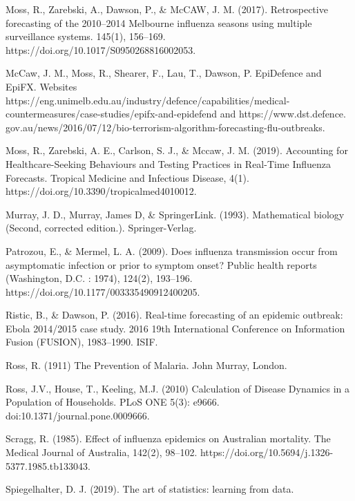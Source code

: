 \begin{thebibliography}{99}
	 Moss, R., Zarebski, A., Dawson, P., \& McCAW, J. M. (2017). Retrospective forecasting of the 2010–2014 Melbourne influenza seasons using multiple surveillance systems. 145(1), 156–169. https://doi.org/10.1017/S0950268816002053.
	
	 McCaw, J. M., Moss, R., Shearer, F., Lau, T., Dawson, P. EpiDefence and EpiFX. Websites https://eng.unimelb.edu.au/industry/defence/capabilities/medical-\\
	countermeasures/case-studies/epifx-and-epidefend and 
	https://www.dst.defence. gov.au/news/2016/07/12/bio-terrorism-algorithm-forecasting-flu-outbreaks.
	
	 Moss, R., Zarebski, A. E., Carlson, S. J., \& Mccaw, J. M. (2019). Accounting for Healthcare-Seeking Behaviours and Testing Practices in Real-Time Influenza Forecasts. Tropical Medicine and Infectious Disease, 4(1). https://doi.org/10.3390/tropicalmed4010012.
	
	 Murray, J. D., Murray, James D, \& SpringerLink. (1993). Mathematical biology (Second, corrected edition.). Springer-Verlag.
	
	 Patrozou, E., \& Mermel, L. A. (2009). Does influenza transmission occur from asymptomatic infection or prior to symptom onset? Public health reports (Washington, D.C. : 1974), 124(2), 193–196. https://doi.org/10.1177/003335490912400205.
	
	 Ristic, B., \& Dawson, P. (2016). Real-time forecasting of an epidemic outbreak: Ebola 2014/2015 case study. 2016 19th International Conference on Information Fusion (FUSION), 1983–1990. ISIF.
	
	 Ross, R. (1911) The Prevention of Malaria. John Murray, London.
	
	 Ross, J.V., House, T., Keeling, M.J. (2010) Calculation of Disease Dynamics in a Population of Households. PLoS ONE 5(3): e9666. doi:10.1371/journal.pone.0009666.
	
	 Scragg, R. (1985). Effect of influenza epidemics on Australian mortality. The Medical Journal of Australia, 142(2), 98–102. https://doi.org/10.5694/j.1326-5377.1985.tb133043.
	
	 Spiegelhalter, D. J. (2019). The art of statistics: learning from data.
	
	

\end{thebibliography}
